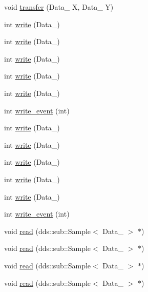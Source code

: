 \begin{DoxyCompactItemize}
\item 
void \hyperlink{classProcessingBlock_ac06b247ec6703ddacc91bd92cf921f13}{transfer} (Data\+\_ X, Data\+\_ Y)
\item 
int \hyperlink{classProcessingBlock_a8d0f41fb6371a35583d36988e3c775a1}{write} (Data\+\_)
\item 
int \hyperlink{classProcessingBlock_a12525c442526e3a65179327eefbc285c}{write} (Data\+\_)
\item 
int \hyperlink{classProcessingBlock_aa5e4574a9c073a7168de88c052f634af}{write} (Data\+\_)
\item 
int \hyperlink{classProcessingBlock_a641e4f0b9cce71f1b8dd0a5fab6d34bb}{write} (Data\+\_)
\item 
int \hyperlink{classProcessingBlock_a7b459f5c8f5bb87f035410cdf6c81dc6}{write} (Data\+\_)
\item 
int \hyperlink{classProcessingBlock_acdbdda9a147f47eb293e258b0d04c2fc}{write\+\_\+event} (int)
\item 
int \hyperlink{classProcessingBlock_a8d0f41fb6371a35583d36988e3c775a1}{write} (Data\+\_)
\item 
int \hyperlink{classProcessingBlock_a12525c442526e3a65179327eefbc285c}{write} (Data\+\_)
\item 
int \hyperlink{classProcessingBlock_aa5e4574a9c073a7168de88c052f634af}{write} (Data\+\_)
\item 
int \hyperlink{classProcessingBlock_a641e4f0b9cce71f1b8dd0a5fab6d34bb}{write} (Data\+\_)
\item 
int \hyperlink{classProcessingBlock_a7b459f5c8f5bb87f035410cdf6c81dc6}{write} (Data\+\_)
\item 
int \hyperlink{classProcessingBlock_acdbdda9a147f47eb293e258b0d04c2fc}{write\+\_\+event} (int)
\item 
void \hyperlink{classProcessingBlock_a7ee3d280a6719691487258e4146965cf}{read} (dds\+::sub\+::\+Sample$<$ Data\+\_ $>$ $\ast$)
\item 
void \hyperlink{classProcessingBlock_a3892cdbc633672421f8e6520552a05a0}{read} (dds\+::sub\+::\+Sample$<$ Data\+\_ $>$ $\ast$)
\item 
void \hyperlink{classProcessingBlock_af5ed150919e8aefb2b59246a4446d85b}{read} (dds\+::sub\+::\+Sample$<$ Data\+\_ $>$ $\ast$)
\item 
void \hyperlink{classProcessingBlock_a88e1ff18f93e6b1ee81dceede85bc9f2}{read} (dds\+::sub\+::\+Sample$<$ Data\+\_ $>$ $\ast$)

\end{DoxyCompactItemize}
